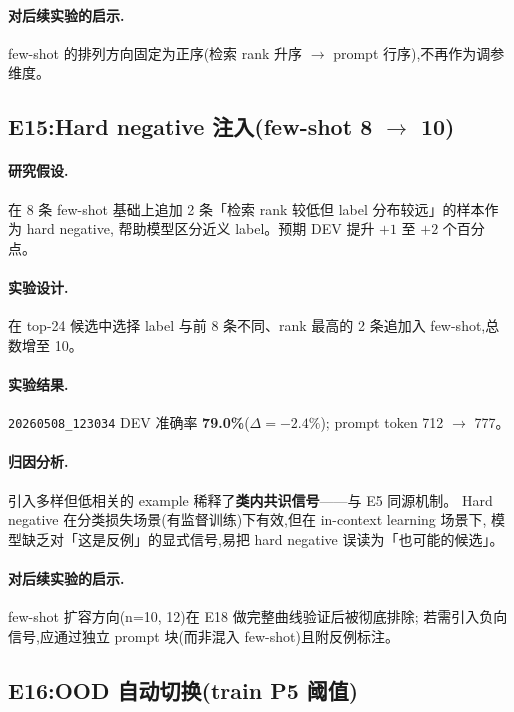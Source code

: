 \documentclass[11pt,a4paper]{ctexart}
\begin{document}
\paragraph{对后续实验的启示.}few-shot 的排列方向固定为正序(检索 rank 升序 $\to$ prompt 行序),不再作为调参维度。

\subsection{E15:Hard negative 注入(few-shot 8 $\to$ 10)}

\paragraph{研究假设.}在 8 条 few-shot 基础上追加 2 条「检索 rank 较低但 label 分布较远」的样本作为 hard negative,
帮助模型区分近义 label。预期 DEV 提升 $+1$ 至 $+2$ 个百分点。

\paragraph{实验设计.}在 top-24 候选中选择 label 与前 8 条不同、rank 最高的 2 条追加入 few-shot,总数增至 10。

\paragraph{实验结果.}\texttt{20260508\_123034} DEV 准确率 \textbf{79.0\%}($\Delta = -2.4\%$);
prompt token 712 $\to$ 777。

\paragraph{归因分析.}引入多样但低相关的 example 稀释了\textbf{类内共识信号}——与 E5 同源机制。
Hard negative 在分类损失场景(有监督训练)下有效,但在 in-context learning 场景下,
模型缺乏对「这是反例」的显式信号,易把 hard negative 误读为「也可能的候选」。

\paragraph{对后续实验的启示.}few-shot 扩容方向(n=10, 12)在 E18 做完整曲线验证后被彻底排除;
若需引入负向信号,应通过独立 prompt 块(而非混入 few-shot)且附反例标注。

\subsection{E16:OOD 自动切换(train P5 阈值)}
\end{document}
